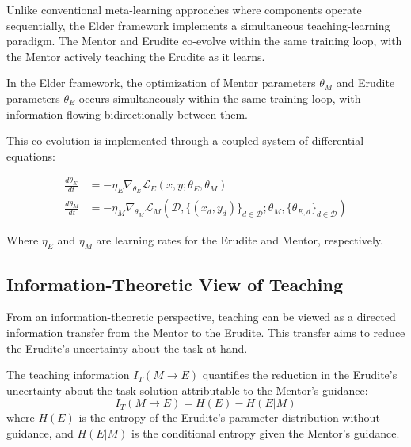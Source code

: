 Unlike conventional meta-learning approaches where components operate sequentially, the Elder framework implements a simultaneous teaching-learning paradigm. The Mentor and Erudite co-evolve within the same training loop, with the Mentor actively teaching the Erudite as it learns.

\begin{proposition}
In the Elder framework, the optimization of Mentor parameters $\theta_M$ and Erudite parameters $\theta_E$ occurs simultaneously within the same training loop, with information flowing bidirectionally between them.
\end{proposition}

This co-evolution is implemented through a coupled system of differential equations:

\begin{equation}
\begin{aligned}
\frac{d\theta_E}{dt} &= -\eta_E \nabla_{\theta_E} \mathcal{L}_E(x, y; \theta_E, \theta_M) \\
\frac{d\theta_M}{dt} &= -\eta_M \nabla_{\theta_M} \mathcal{L}_M(\mathcal{D}, \{(x_d, y_d)\}_{d \in \mathcal{D}}; \theta_M, \{\theta_{E,d}\}_{d \in \mathcal{D}})
\end{aligned}
\end{equation}

Where $\eta_E$ and $\eta_M$ are learning rates for the Erudite and Mentor, respectively.

\subsection{Information-Theoretic View of Teaching}

From an information-theoretic perspective, teaching can be viewed as a directed information transfer from the Mentor to the Erudite. This transfer aims to reduce the Erudite's uncertainty about the task at hand.

\begin{definition}
The teaching information $I_T(M \rightarrow E)$ quantifies the reduction in the Erudite's uncertainty about the task solution attributable to the Mentor's guidance:
\begin{equation}
I_T(M \rightarrow E) = H(E) - H(E|M)
\end{equation}
where $H(E)$ is the entropy of the Erudite's parameter distribution without guidance, and $H(E|M)$ is the conditional entropy given the Mentor's guidance.
\end{definition}


